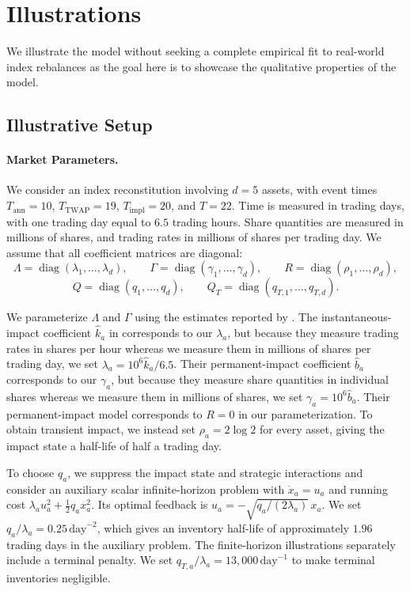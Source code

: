 \documentclass[12pt]{article}
\numberwithin{equation}{section}
\theoremstyle{definition}
\begin{document}
\section{Illustrations}\label{sec:experiments}

We illustrate the model without seeking a complete empirical fit to real-world
index rebalances as the goal here is to showcase the qualitative properties
of the model. 

\subsection{Illustrative Setup}\label{sec:experiments_setup}

\paragraph{Market Parameters.}

We consider an index reconstitution involving \(d=5\) assets, with event times
\(T_{\mathrm{ann}}=10\), \(T_{\mathrm{TWAP}}=19\), \(T_{\mathrm{impl}}=20\), and \(T=22.\)
Time is measured in trading days, with one trading day equal to \(6.5\) trading
hours. Share quantities are
measured in millions of shares, and trading rates in millions of shares per
trading day. We assume that all coefficient matrices are diagonal:
\[
\Lambda=\operatorname{diag}(\lambda_1,\ldots,\lambda_d),
\qquad
\Gamma=\operatorname{diag}(\gamma_1,\ldots,\gamma_d),
\qquad
R=\operatorname{diag}(\rho_1,\ldots,\rho_d),
\]
\[
Q=\operatorname{diag}(q_1,\ldots,q_d),
\qquad
Q_T=\operatorname{diag}(q_{T,1},\ldots,q_{T,d}).
\]

We parameterize \(\Lambda\) and \(\Gamma\) using the estimates reported by
\cite[Table~A.7]{cartea_jaimungal_2016}. The instantaneous-impact coefficient
\(\hat k_a\) in \cite{cartea_jaimungal_2016} corresponds to our \(\lambda_a\), but because they measure trading
rates in shares per hour whereas we measure them in millions of shares per
trading day, we set \(\lambda_a=10^6\hat k_a/6.5\). Their permanent-impact
coefficient \(\hat b_a\) corresponds to our \(\gamma_a\), but because they
measure share quantities in individual shares whereas we measure them in
millions of shares, we set \(\gamma_a=10^6\hat b_a\). Their permanent-impact
model corresponds to \(R=0\) in our parameterization. To obtain transient
impact, we instead set \(\rho_a=2\log 2\) for every asset, giving the impact
state a half-life of half a trading day.

To choose \(q_a\), we suppress the impact state and strategic interactions
and consider an auxiliary scalar infinite-horizon problem with
\(\dot x_a=u_a\) and running cost
\(\lambda_a u_a^2+\frac{1}{2}q_a x_a^2\). Its optimal
feedback is \(u_a=-\sqrt{q_a/(2\lambda_a)}\,x_a\). We set
\(q_a/\lambda_a=0.25\,\mathrm{day}^{-2}\), which gives an inventory half-life
of approximately \(1.96\) trading days in the auxiliary problem. The
finite-horizon illustrations separately include a terminal penalty. We set
\(q_{T,a}/\lambda_a=13{,}000\,\mathrm{day}^{-1}\) to make terminal inventories
negligible.
\end{document}

